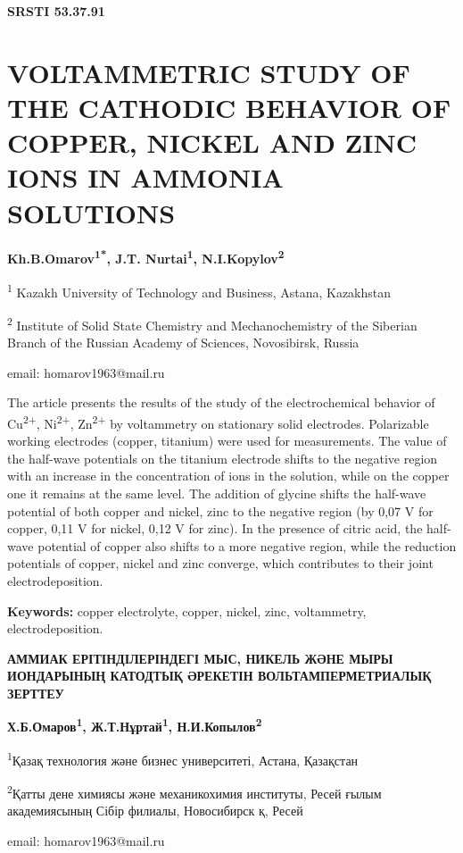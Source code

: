 \clearpage
{\bfseries SRSTI 53.37.91}

\section{VOLTAMMETRIC STUDY OF THE CATHODIC BEHAVIOR OF COPPER, NICKEL
AND ZINC IONS IN AMMONIA SOLUTIONS}

\begin{center}
{\bfseries Kh.B.Omarov\textsuperscript{1*}, J.T. Nurtai\textsuperscript{1},
N.I.Kopylov\textsuperscript{2}}

\textsuperscript{1} Kazakh University of Technology and Business,
Astana, Kazakhstan

\textsuperscript{2} Institute of Solid State Chemistry and
Mechanochemistry of the Siberian Branch of the Russian Academy of
Sciences, Novosibirsk, Russia

email: homarov1963@mail.ru
\end{center}

The article presents the results of the study of the electrochemical
behavior of Cu\textsuperscript{2+}, Ni\textsuperscript{2+},
Zn\textsuperscript{2+} by voltammetry on stationary solid electrodes.
Polarizable working electrodes (copper, titanium) were used for
measurements. The value of the half-wave potentials on the titanium
electrode shifts to the negative region with an increase in the
concentration of ions in the solution, while on the copper one it
remains at the same level. The addition of glycine shifts the half-wave
potential of both copper and nickel, zinc to the negative region (by
0,07 V for copper, 0,11 V for nickel, 0,12 V for zinc). In the presence
of citric acid, the half-wave potential of copper also shifts to a more
negative region, while the reduction potentials of copper, nickel and
zinc converge, which contributes to their joint electrodeposition.

{\bfseries Keywords:} copper electrolyte, copper, nickel, zinc,
voltammetry, electrodeposition.

\begin{center}
{\large\bfseries АММИАК ЕРІТІНДІЛЕРІНДЕГІ МЫС, НИКЕЛЬ ЖӘНЕ МЫРЫ ИОНДАРЫНЫҢ КАТОДТЫҚ ӘРЕКЕТІН ВОЛЬТАМПЕРМЕТРИАЛЫҚ ЗЕРТТЕУ}

\vspace{1em}
{\bfseries Х.Б.Омаров\textsuperscript{1}, Ж.Т.Нұртай\textsuperscript{1},
Н.И.Копылов\textsuperscript{2}}

\textsuperscript{1}Қазақ технология және бизнес университеті, Астана,
Қазақстан

\textsuperscript{2}Қатты дене химиясы және механикохимия институты,
Ресей ғылым академиясының Сібір филиалы, Новосибирск қ, Ресей

email: homarov1963@mail.ru
\end{center}

